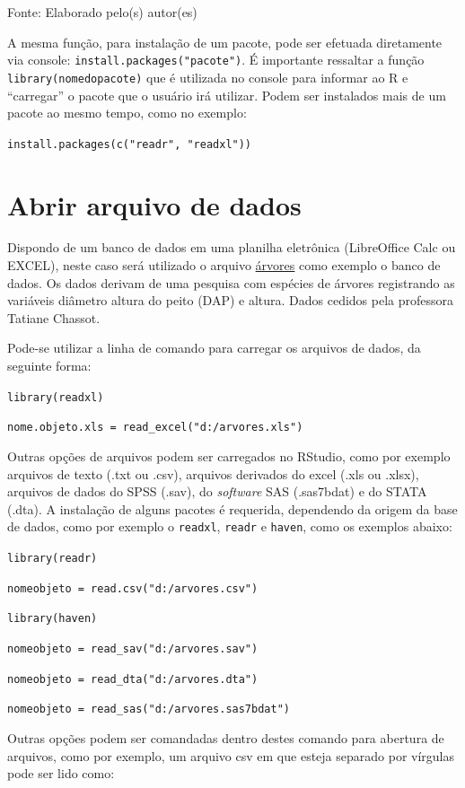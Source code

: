 \documentclass[12pt,brazil,]{book}
\begin{document}
Fonte: Elaborado pelo(s) autor(es)

A mesma função, para instalação de um pacote, pode ser efetuada
diretamente via console: \texttt{install.packages("pacote")}. É
importante ressaltar a função \texttt{library(nomedopacote)} que é
utilizada no console para informar ao R e ``carregar'' o pacote que o
usuário irá utilizar. Podem ser instalados mais de um pacote ao mesmo
tempo, como no exemplo:

\texttt{install.packages(c("readr",\ "readxl"))}

\hypertarget{abrir-arquivo-de-dados}{%
\section{Abrir arquivo de dados}\label{abrir-arquivo-de-dados}}

Dispondo de um banco de dados em uma planilha eletrônica (LibreOffice
Calc ou EXCEL), neste caso será utilizado o arquivo
\href{https://github.com/Smolski/softwarelivrer/raw/master/basico/arvores.xlsx}{árvores}
como exemplo o banco de dados. Os dados derivam de uma pesquisa com
espécies de árvores registrando as variáveis diâmetro altura do peito
(DAP) e altura. Dados cedidos pela professora Tatiane Chassot.

Pode-se utilizar a linha de comando para carregar os arquivos de dados,
da seguinte forma:

\texttt{library(readxl)}

\texttt{nome.objeto.xls\ =\ read\_excel("d:/arvores.xls")}

Outras opções de arquivos podem ser carregados no RStudio, como por
exemplo arquivos de texto (.txt ou .csv), arquivos derivados do excel
(.xls ou .xlsx), arquivos de dados do SPSS (.sav), do \emph{software}
SAS (.sas7bdat) e do STATA (.dta). A instalação de alguns pacotes é
requerida, dependendo da origem da base de dados, como por exemplo o
\texttt{readxl}, \texttt{readr} e \texttt{haven}, como os exemplos
abaixo:

\texttt{library(readr)}

\texttt{nomeobjeto\ =\ read.csv("d:/arvores.csv")}

\texttt{library(haven)}

\texttt{nomeobjeto\ =\ read\_sav("d:/arvores.sav")}

\texttt{nomeobjeto\ =\ read\_dta("d:/arvores.dta")}

\texttt{nomeobjeto\ =\ read\_sas("d:/arvores.sas7bdat")}

Outras opções podem ser comandadas dentro destes comando para abertura
de arquivos, como por exemplo, um arquivo csv em que esteja separado por
vírgulas pode ser lido como:
\end{document}
